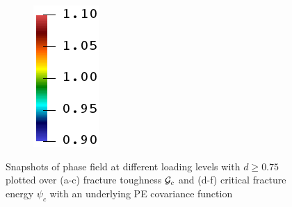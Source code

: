 \begin{figure}[!htbp]
\begin{subfigure}[b]{0.08\textwidth}
    \includegraphics[width=\textwidth]{Chapter4/figures/rainbow_vertical.png}
    \vspace{0.15in}
  \end{subfigure}
  \caption[Snapshots of phase field at different loading levels with a PE covariance function.]{Snapshots of phase field at different loading levels with $d \geqslant 0.75$ plotted over (a-c) fracture toughness ${\mathcal{G}_c}$ and (d-f) critical fracture energy $\psi_c$ with an underlying PE covariance function }
  \label{fig: Chapter4/2D/compare_sensitivity_exp}
\end{figure}
